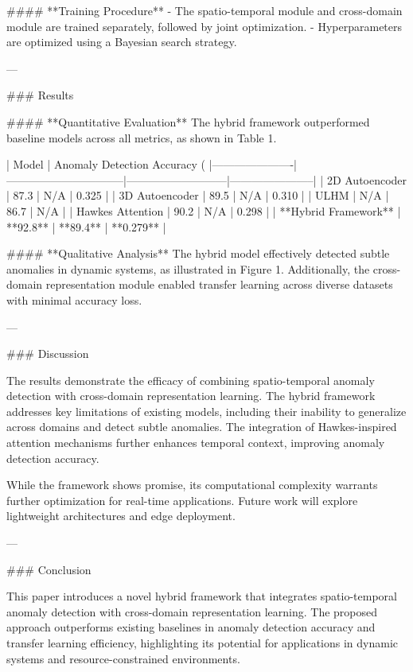 #### **Training Procedure**  
- The spatio-temporal module and cross-domain module are trained separately, followed by joint optimization.  
- Hyperparameters are optimized using a Bayesian search strategy.  

---

### Results  

#### **Quantitative Evaluation**  
The hybrid framework outperformed baseline models across all metrics, as shown in Table 1.  

| Model                | Anomaly Detection Accuracy (%
|----------------------|--------------------------------|---------------------------|-----------------------|
| 2D Autoencoder       | 87.3                          | N/A                       | 0.325                 |
| 3D Autoencoder       | 89.5                          | N/A                       | 0.310                 |
| ULHM                 | N/A                           | 86.7                      | N/A                   |
| Hawkes Attention     | 90.2                          | N/A                       | 0.298                 |
| **Hybrid Framework** | **92.8**                      | **89.4**                  | **0.279**             |

#### **Qualitative Analysis**  
The hybrid model effectively detected subtle anomalies in dynamic systems, as illustrated in Figure 1. Additionally, the cross-domain representation module enabled transfer learning across diverse datasets with minimal accuracy loss.  

---

### Discussion  

The results demonstrate the efficacy of combining spatio-temporal anomaly detection with cross-domain representation learning. The hybrid framework addresses key limitations of existing models, including their inability to generalize across domains and detect subtle anomalies. The integration of Hawkes-inspired attention mechanisms further enhances temporal context, improving anomaly detection accuracy.  

While the framework shows promise, its computational complexity warrants further optimization for real-time applications. Future work will explore lightweight architectures and edge deployment.  

---

### Conclusion  

This paper introduces a novel hybrid framework that integrates spatio-temporal anomaly detection with cross-domain representation learning. The proposed approach outperforms existing baselines in anomaly detection accuracy and transfer learning efficiency, highlighting its potential for applications in dynamic systems and resource-constrained environments.  

